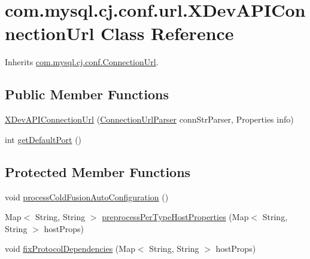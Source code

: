 \hypertarget{classcom_1_1mysql_1_1cj_1_1conf_1_1url_1_1_x_dev_a_p_i_connection_url}{}\section{com.\+mysql.\+cj.\+conf.\+url.\+X\+Dev\+A\+P\+I\+Connection\+Url Class Reference}
\label{classcom_1_1mysql_1_1cj_1_1conf_1_1url_1_1_x_dev_a_p_i_connection_url}


Inherits \mbox{\hyperlink{classcom_1_1mysql_1_1cj_1_1conf_1_1_connection_url}{com.\+mysql.\+cj.\+conf.\+Connection\+Url}}.

\subsection*{Public Member Functions}
\begin{DoxyCompactItemize}
\item 
\mbox{\hyperlink{classcom_1_1mysql_1_1cj_1_1conf_1_1url_1_1_x_dev_a_p_i_connection_url_a81df74119f400043949eb96ebec792e0}{X\+Dev\+A\+P\+I\+Connection\+Url}} (\mbox{\hyperlink{classcom_1_1mysql_1_1cj_1_1conf_1_1_connection_url_parser}{Connection\+Url\+Parser}} conn\+Str\+Parser, Properties info)
\item 
int \mbox{\hyperlink{classcom_1_1mysql_1_1cj_1_1conf_1_1url_1_1_x_dev_a_p_i_connection_url_aa04f1d1cab569006945ddfe93314a0de}{get\+Default\+Port}} ()
\end{DoxyCompactItemize}
\subsection*{Protected Member Functions}
\begin{DoxyCompactItemize}
\item 
void \mbox{\hyperlink{classcom_1_1mysql_1_1cj_1_1conf_1_1url_1_1_x_dev_a_p_i_connection_url_af0d83e17264427f0a92e9b58531c5b5a}{process\+Cold\+Fusion\+Auto\+Configuration}} ()
\item 
Map$<$ String, String $>$ \mbox{\hyperlink{classcom_1_1mysql_1_1cj_1_1conf_1_1url_1_1_x_dev_a_p_i_connection_url_a548bba93e1640c9943483458a49a3dd4}{preprocess\+Per\+Type\+Host\+Properties}} (Map$<$ String, String $>$ host\+Props)
\item 
void \mbox{\hyperlink{classcom_1_1mysql_1_1cj_1_1conf_1_1url_1_1_x_dev_a_p_i_connection_url_a26ddac3fdb0a85e6f5dfb869bd218e52}{fix\+Protocol\+Dependencies}} (Map$<$ String, String $>$ host\+Props)
\end{DoxyCompactItemize}
